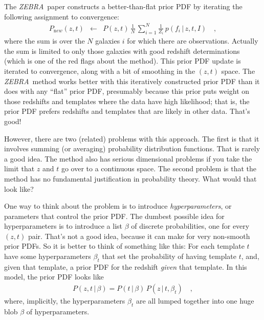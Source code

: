 \documentclass[12pt]{article}
\newcommand{\ZEBRA}{\textsl{ZEBRA}}
\newcommand{\given}{\,|\,}
\newcommand{\new}{\mathrm new}
\begin{document}
The \ZEBRA\ paper constructs a better-than-flat prior PDF by iterating
the following assignment to convergence:
\begin{eqnarray}\displaystyle
P_{\new}(z, t) &\leftarrow&
  P(z, t)\,\frac{1}{N}
  \,\sum_{i=1}^N \frac{1}{Z_i}\,p(f_i \given z, t, I)
\quad ,
\end{eqnarray}
where the sum is over the $N$ galaxies $i$ for which there are
observations.  Actually the sum is limited to only those galaxies with
good redshift determinations (which is one of the red flags about the
method).  This prior PDF update is iterated to convergence, along with
a bit of smoothing in the $(z, t)$ space.  The \ZEBRA\ method works
better with this iteratively constructed prior PDF than it does with
any ``flat'' prior PDF, presumably because this prior puts weight on
those redshifts and templates where the data have high likelihood;
that is, the prior PDF prefers redshifts and templates that are likely
in other data.  That's good!

However, there are two (related) problems with this approach.  The
first is that it involves summing (or averaging) probability
distribution functions.  That is rarely a good idea.  The method also
has serious dimensional problems if you take the limit that $z$ and
$t$ go over to a continuous space.  The second problem is that the
method has no fundamental justification in probability theory.  What
would that look like?

One way to think about the problem is to introduce
\emph{hyperparameters}, or parameters that control the prior PDF.  The
dumbest possible idea for hyper\-parameters is to introduce a list
$\beta$ of discrete probabilities, one for every $(z, t)$ pair.
That's not a good idea, because it can make for very non-smooth prior
PDFs.  So it is better to think of something like this: For each
template $t$ have some hyper\-parameters $\beta_t$ that set the
probability of having template $t$, and, given that template, a prior
PDF for the redshift \emph{given} that template.  In this model, the
prior PDF looks like
\begin{eqnarray}\displaystyle
P(z, t \given \beta) = P(t \given \beta)\,P(z \given t, \beta_t)
\quad,
\end{eqnarray}
where, implicitly, the hyper\-parameters $\beta_t$ are all lumped
together into one huge blob $\beta$ of hyper\-parameters.
\end{document}
